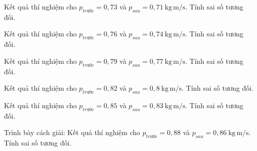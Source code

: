 \begin{ex}
Kết quả thí nghiệm cho $p_{trước}=0,73$ và $p_{sau}=0,71\ \mathrm{kg\,m/s}$. Tính sai số tương đối.
\end{ex}

\begin{ex}
Kết quả thí nghiệm cho $p_{trước}=0,76$ và $p_{sau}=0,74\ \mathrm{kg\,m/s}$. Tính sai số tương đối.
\end{ex}

\begin{ex}
Kết quả thí nghiệm cho $p_{trước}=0,79$ và $p_{sau}=0,77\ \mathrm{kg\,m/s}$. Tính sai số tương đối.
\end{ex}

\begin{ex}
Kết quả thí nghiệm cho $p_{trước}=0,82$ và $p_{sau}=0,8\ \mathrm{kg\,m/s}$. Tính sai số tương đối.
\end{ex}

\begin{ex}
Kết quả thí nghiệm cho $p_{trước}=0,85$ và $p_{sau}=0,83\ \mathrm{kg\,m/s}$. Tính sai số tương đối.
\end{ex}

\begin{bt}
Trình bày cách giải: Kết quả thí nghiệm cho $p_{trước}=0,88$ và $p_{sau}=0,86\ \mathrm{kg\,m/s}$. Tính sai số tương đối.
\end{bt}

